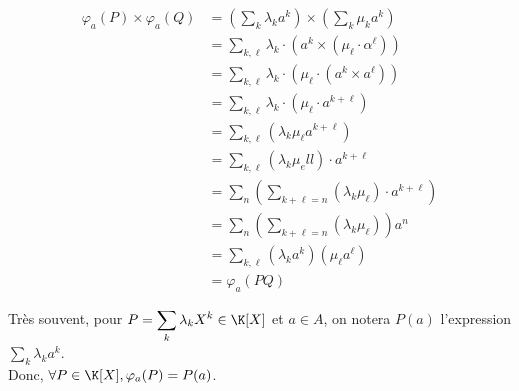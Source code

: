 \documentclass[12pt, a4paper]{report}
\begin{document}
\begin{demo}{}
\begin{enumerate}
	\begin{align*}
	\varphi_a(P) \times \varphi_a(Q) &= \left(\displaystyle{\sum_k \lambda_ka^k}\right) \times \left(\displaystyle{\sum_k \mu_k a^k}\right) \\
	&= \displaystyle{\sum_{k,\ell}\lambda_k \cdot (a^k \times (\mu_\ell \cdot \alpha^\ell))} \\
	&= \displaystyle{\sum_{k,\ell} \lambda_k \cdot (\mu_\ell \cdot (a^k \times a^\ell))} \\
	&= \displaystyle{\sum_{k,\ell} \lambda_k \cdot (\mu_\ell \cdot a^{k+\ell})} \\
	&= \displaystyle{\sum_{k,\ell} (\lambda_k \mu_\ell a^{k+\ell})} \\
	&= \displaystyle{\sum_{k,\ell}(\lambda_k\mu_ell)\cdot a^{k+\ell}} \\
	&= \displaystyle{\sum_n \left(\sum_{k+\ell = n} (\lambda_k \mu_\ell)\cdot a^{k + \ell} \right)} \\
	&= \displaystyle{\sum_n \left(\sum_{k+\ell = n}(\lambda_k \mu_\ell) \right) a^n} \\
	&= \displaystyle{\sum_{k,\ell}(\lambda_ka^k)(\mu_\ell a^\ell)} \\
	&= \varphi_a(PQ)
	\end{align*}

\end{enumerate}

\end{demo}

\begin{remarque}{}
Très souvent, pour $P = \displaystyle{\sum_k \lambda_k X^k} \in \K[X]$ et $a \in A$, on notera $P(a)$ l'expression $\displaystyle{\sum_k \lambda_k a^k}$. \\
Donc, $\forall P \in \K[X], \varphi_a(P) = P(a)$.
\end{remarque}
\end{document}
